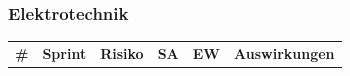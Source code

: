\documentclass[main.tex]{subfiles} %
\begin{document}
\begin{table}[H]
\begin{tabularx}{\textwidth}
    \end{tabularx}
    \caption{Erkannte Risiken aus dem Bereich der Mechanik}
\end{table}

\subsubsection* {Elektrotechnik}
\setcounter{counter}{0}
\begin{table}[H]
    \begin{tabularx}{\textwidth}{|>{\centering\arraybackslash}p{0.5cm}|>{\raggedright\arraybackslash}p{1.5cm}|>{\raggedright\arraybackslash}X|>{\centering\arraybackslash}p{0.75cm}|>{\centering\arraybackslash}p{0.75cm}|>{\raggedright\arraybackslash}X|}
        \hline
        \textbf{\#}                                                          & \textbf{Sprint} & \textbf{Risiko}                                                         & \textbf{SA} & \textbf{EW} & \textbf{Auswirkungen}                                                                                         \\


\end{tabularx}
\end{table}
\end{document}

